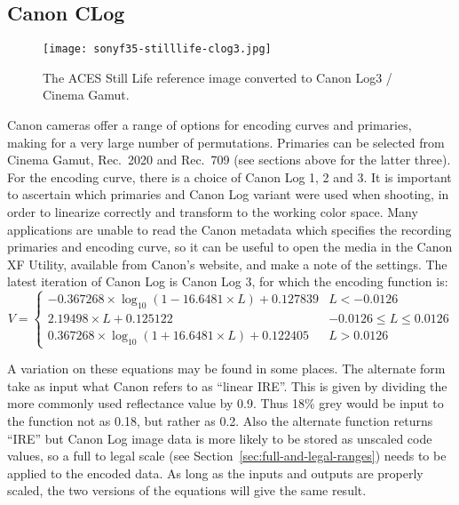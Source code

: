 \subsection{Canon CLog}%
\label{subsec:canon-clog}

\begin{figure}[H]
    \texttt{[image: sonyf35-stilllife-clog3.jpg]}
    \caption{
        The ACES Still Life reference image converted to Canon Log3 / Cinema Gamut.\newline
        \ccCopyrightAmpas
    }%
    \label{fig:stilllife-clog3}
\end{figure}

Canon cameras offer a range of options for encoding curves and primaries, making for a very large number of permutations.
Primaries can be selected from Cinema Gamut, Rec.~2020 and Rec.~709 (see sections above for the latter three).
For the encoding curve, there is a choice of Canon Log 1, 2 and 3.
It is important to ascertain which primaries and Canon Log variant were used when shooting, in order to linearize correctly and transform to the working color space.
Many applications are unable to read the Canon metadata which specifies the recording primaries and encoding curve, so it can be useful to open the media in the Canon XF Utility, available from Canon's website, and make a note of the settings.
\ccPar{}
The latest iteration of Canon Log is Canon Log 3, for which the encoding function is:
\begin{equation}
    V =
    \begin{cases}
        -0.367268 \times \log _{10}(1 - 16.6481 \times L) + 0.127839 & L < -0.0126 \\
         2.19498 \times L + 0.125122 & -0.0126 \leq L \leq 0.0126 \\
         0.367268 \times \log _{10}(1 + 16.6481 \times L) + 0.122405 & L > 0.0126
    \end{cases}
\end{equation}

A variation on these equations may be found in some places.
The alternate form take as input what Canon refers to as ``linear IRE''.
This is given by dividing the more commonly used reflectance value by 0.9.
Thus 18\% grey would be input to the function not as 0.18, but rather as 0.2.
Also the alternate function returns ``IRE'' but Canon Log image data is more likely to be stored as unscaled code values, so a full to legal scale (see Section~\ref{sec:full-and-legal-ranges}) needs to be applied to the encoded data.
As long as the inputs and outputs are properly scaled, the two versions of the equations will give the same result.

